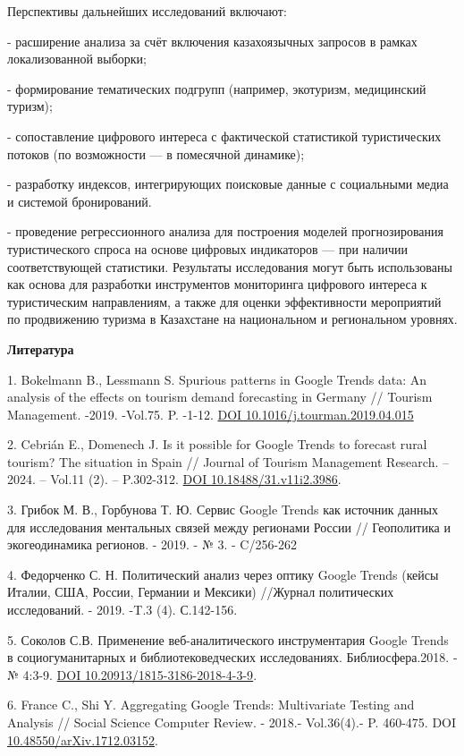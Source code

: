 Перспективы дальнейших исследований включают:


- расширение анализа за счёт включения казахоязычных запросов в рамках
локализованной выборки;

- формирование тематических подгрупп (например, экотуризм, медицинский
туризм);

- сопоставление цифрового интереса с фактической статистикой
туристических потоков (по возможности --- в помесячной динамике);

- разработку индексов, интегрирующих поисковые данные с социальными
медиа и системой бронирований.

- проведение регрессионного анализа для построения моделей
прогнозирования туристического спроса на основе цифровых индикаторов
--- при наличии соответствующей статистики.
Результаты исследования могут быть использованы как основа для
разработки инструментов мониторинга цифрового интереса к туристическим
направлениям, а также для оценки эффективности мероприятий по
продвижению туризма в Казахстане на национальном и региональном уровнях.

{\bfseries Литература}

1. Bokelmann B., Lessmann S. Spurious patterns in Google Trends data: An
analysis of the effects on tourism demand forecasting in Germany //
Tourism Management. -2019. -Vol.75. P. -1-12.
\href{https://doi.org/10.1016/j.tourman.2019.04.015}{DOI
10.1016/j.tourman.2019.04.015}

2. Cebrián E., Domenech J. Is it possible for Google Trends to forecast
rural tourism? The situation in Spain // Journal of Tourism Management
Research. -- 2024. -- Vol.11 (2). -- P.302-312.
\href{https://doi.org/10.18488/31.v11i2.3986}{DOI
10.18488/31.v11i2.3986}.

3. Грибок М. В., Горбунова Т. Ю. Сервис Google Trends как источник данных
для исследования ментальных связей между регионами России // Геополитика
и экогеодинамика регионов. - 2019. - № 3. - C/256-262

4. Федорченко С. Н. Политический анализ через оптику Google Trends (кейсы
Италии, США, России, Германии и Мексики) //Журнал политических
исследований. - 2019. -T.3 (4). С.142-156.

5. Соколов С.В. Применение веб-аналитического инструментария Google
Trends в социогуманитарных и библиотековедческих исследованиях.
Библиосфера.2018. - № 4:3-9.
\href{https://doi.org/10.20913/1815-3186-2018-4-3-9}{DOI
10.20913/1815-3186-2018-4-3-9}.

6. France C., Shi Y. Aggregating Google Trends: Multivariate Testing and
Analysis // Social Science Computer Review. - 2018.- Vol.36(4).- P.
460-475. DOI
\href{http://dx.doi.org/10.48550/arXiv.1712.03152}{10.48550/arXiv.1712.03152}.

